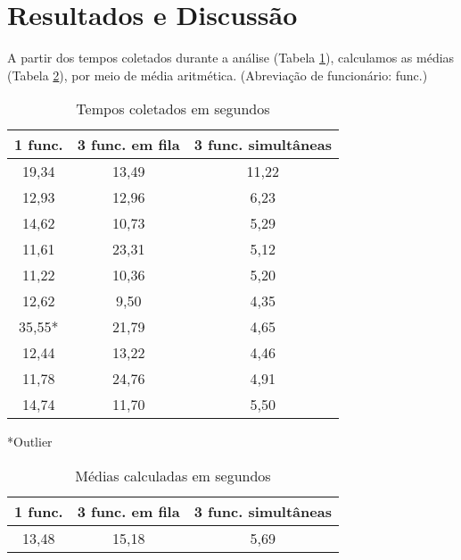 \documentclass[
	12pt,				%
	oneside,			%
	a4paper,			%
	english,			%
	french,				%
	spanish,			%
	brazil,				%
	]{abntex2}
\begin{document}



\newpage
\section[Resultados e Discussão]{Resultados e Discussão}
\pagestyle{fancy}

A partir dos tempos coletados durante a análise (Tabela \ref{t1}), calculamos as médias (Tabela \ref{t2}), por meio de média aritmética. (Abreviação de funcionário: func.)

\begin{table}[H]
\centering
\caption{Tempos coletados em segundos}
\vspace{0.5cm}
\begin{tabular}{c|c|c}

\textbf{1 func.} & \textbf{3 func. em fila} & \textbf{3 func. simultâneas}\\
\hline

19,34 & 13,49 & 11,22 \\ \hline
12,93 & 12,96 & 6,23 \\ \hline
14,62 & 10,73 & 5,29\\ \hline
11,61 & 23,31 & 5,12\\ \hline
11,22 & 10,36 & 5,20\\ \hline
12,62 & 9,50 & 4,35\\ \hline
35,55* & 21,79 & 4,65\\ \hline
12,44 & 13,22 & 4,46\\ \hline
11,78 & 24,76 & 4,91\\ \hline
14,74 & 11,70 & 5,50

\end{tabular}
\label{t1}
\end{table}

*Outlier

\begin{table}[H]
\centering
\caption{Médias calculadas em segundos}
\vspace{0.5cm}
\begin{tabular}{c|c|c}

\textbf{1 func.} & \textbf{3 func. em fila} & \textbf{3 func. simultâneas}\\
\hline

13,48 & 15,18 & 5,69 

\end{tabular}
\label{t2}
\end{table}
\end{document}
